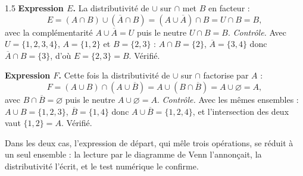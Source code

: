 \begin{corrige}{1.5}
\textbf{Expression $E$.} La distributivité de $\cup$ sur $\cap$ met $B$ en facteur :
\[
E = (A \cap B) \cup (\overline{A} \cap B) = (A \cup \overline{A}) \cap B = U \cap B = B ,
\]
avec la complémentarité $A \cup \overline{A} = U$ puis le neutre $U \cap B = B$. \emph{Contrôle.} Avec $U = \{1, 2, 3, 4\}$, $A = \{1, 2\}$ et $B = \{2, 3\}$ : $A \cap B = \{2\}$, $\overline{A} = \{3, 4\}$ donc $\overline{A} \cap B = \{3\}$, d'où $E = \{2, 3\} = B$. Vérifié.

\textbf{Expression $F$.} Cette fois la distributivité de $\cup$ sur $\cap$ factorise par $A$ :
\[
F = (A \cup B) \cap (A \cup \overline{B}) = A \cup (B \cap \overline{B}) = A \cup \varnothing = A ,
\]
avec $B \cap \overline{B} = \varnothing$ puis le neutre $A \cup \varnothing = A$. \emph{Contrôle.} Avec les mêmes ensembles : $A \cup B = \{1, 2, 3\}$, $\overline{B} = \{1, 4\}$ donc $A \cup \overline{B} = \{1, 2, 4\}$, et l'intersection des deux vaut $\{1, 2\} = A$. Vérifié.

Dans les deux cas, l'expression de départ, qui mêle trois opérations, se réduit à un seul ensemble : la lecture par le diagramme de Venn l'annonçait, la distributivité l'écrit, et le test numérique le confirme.
\end{corrige}
